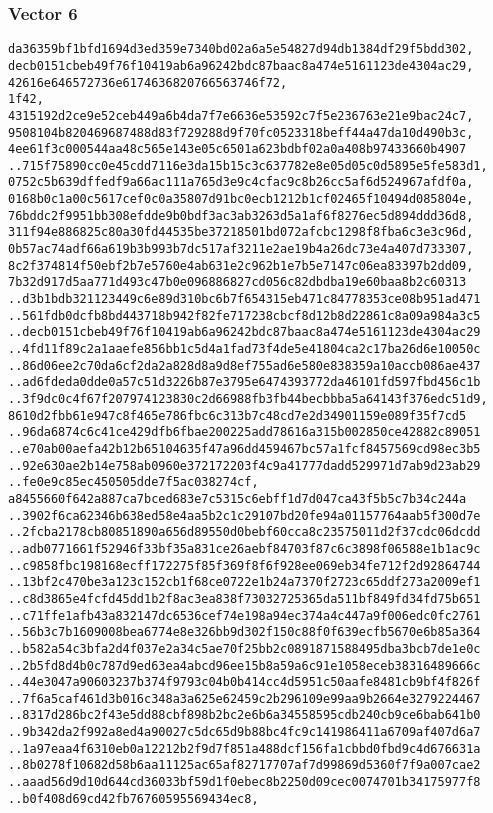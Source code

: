 \documentclass[
]{article}
\begin{document}
\hypertarget{vector-6-2}{%
\subsubsection{Vector 6}\label{vector-6-2}}

\begin{verbatim}
da36359bf1bfd1694d3ed359e7340bd02a6a5e54827d94db1384df29f5bdd302,
decb0151cbeb49f76f10419ab6a96242bdc87baac8a474e5161123de4304ac29,
42616e646572736e6174636820766563746f72,
1f42,
4315192d2ce9e52ceb449a6b4da7f7e6636e53592c7f5e236763e21e9bac24c7,
9508104b820469687488d83f729288d9f70fc0523318beff44a47da10d490b3c,
4ee61f3c000544aa48c565e143e05c6501a623bdbf02a0a408b97433660b4907
..715f75890cc0e45cdd7116e3da15b15c3c637782e8e05d05c0d5895e5fe583d1,
0752c5b639dffedf9a66ac111a765d3e9c4cfac9c8b26cc5af6d524967afdf0a,
0168b0c1a00c5617cef0c0a35807d91bc0ecb1212b1cf02465f10494d085804e,
76bddc2f9951bb308efdde9b0bdf3ac3ab3263d5a1af6f8276ec5d894ddd36d8,
311f94e886825c80a30fd44535be37218501bd072afcbc1298f8fba6c3e3c96d,
0b57ac74adf66a619b3b993b7dc517af3211e2ae19b4a26dc73e4a407d733307,
8c2f374814f50ebf2b7e5760e4ab631e2c962b1e7b5e7147c06ea83397b2dd09,
7b32d917d5aa771d493c47b0e096886827cd056c82dbdba19e60baa8b2c60313
..d3b1bdb321123449c6e89d310bc6b7f654315eb471c84778353ce08b951ad471
..561fdb0dcfb8bd443718b942f82fe717238cbcf8d12b8d22861c8a09a984a3c5
..decb0151cbeb49f76f10419ab6a96242bdc87baac8a474e5161123de4304ac29
..4fd11f89c2a1aaefe856bb1c5d4a1fad73f4de5e41804ca2c17ba26d6e10050c
..86d06ee2c70da6cf2da2a828d8a9d8ef755ad6e580e838359a10accb086ae437
..ad6fdeda0dde0a57c51d3226b87e3795e6474393772da46101fd597fbd456c1b
..3f9dc0c4f67f207974123830c2d66988fb3fb44becbbba5a64143f376edc51d9,
8610d2fbb61e947c8f465e786fbc6c313b7c48cd7e2d34901159e089f35f7cd5
..96da6874c6c41ce429dfb6fbae200225add78616a315b002850ce42882c89051
..e70ab00aefa42b12b65104635f47a96dd459467bc57a1fcf8457569cd98ec3b5
..92e630ae2b14e758ab0960e372172203f4c9a41777dadd529971d7ab9d23ab29
..fe0e9c85ec450505dde7f5ac038274cf,
a8455660f642a887ca7bced683e7c5315c6ebff1d7d047ca43f5b5c7b34c244a
..3902f6ca62346b638ed58e4aa5b2c1c29107bd20fe94a01157764aab5f300d7e
..2fcba2178cb80851890a656d89550d0bebf60cca8c23575011d2f37cdc06dcdd
..adb0771661f52946f33bf35a831ce26aebf84703f87c6c3898f06588e1b1ac9c
..c9858fbc198168ecff172275f85f369f8f6f928ee069eb34fe712f2d92864744
..13bf2c470be3a123c152cb1f68ce0722e1b24a7370f2723c65ddf273a2009ef1
..c8d3865e4fcfd45dd1b2f8ac3ea838f73032725365da511bf849fd34fd75b651
..c71ffe1afb43a832147dc6536cef74e198a94ec374a4c447a9f006edc0fc2761
..56b3c7b1609008bea6774e8e326bb9d302f150c88f0f639ecfb5670e6b85a364
..b582a54c3bfa2d4f037e2a34c5ae70f25bb2c0891871588495dba3bcb7de1e0c
..2b5fd8d4b0c787d9ed63ea4abcd96ee15b8a59a6c91e1058eceb38316489666c
..44e3047a90603237b374f9793c04b0b414cc4d5951c50aafe8481cb9bf4f826f
..7f6a5caf461d3b016c348a3a625e62459c2b296109e99aa9b2664e3279224467
..8317d286bc2f43e5dd88cbf898b2bc2e6b6a34558595cdb240cb9ce6bab641b0
..9b342da2f992a8ed4a90027c5dc65d9b88bc4fc9c141986411a6709af407d6a7
..1a97eaa4f6310eb0a12212b2f9d7f851a488dcf156fa1cbbd0fbd9c4d676631a
..8b0278f10682d58b6aa11125ac65af82717707af7d99869d5360f7f9a007cae2
..aaad56d9d10d644cd36033bf59d1f0ebec8b2250d09cec0074701b34175977f8
..b0f408d69cd42fb76760595569434ec8,
\end{verbatim}
\end{document}
